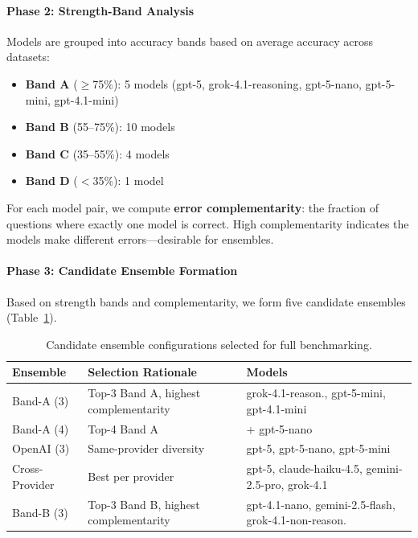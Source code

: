 \documentclass[11pt,a4paper]{article}
\begin{document}
\paragraph{Phase 2: Strength-Band Analysis}
Models are grouped into accuracy bands based on average accuracy across datasets:
\begin{itemize}
    \item \textbf{Band A} ($\geq$75\%): 5 models (gpt-5, grok-4.1-reasoning, gpt-5-nano, gpt-5-mini, gpt-4.1-mini)
    \item \textbf{Band B} (55--75\%): 10 models
    \item \textbf{Band C} (35--55\%): 4 models
    \item \textbf{Band D} ($<$35\%): 1 model
\end{itemize}

For each model pair, we compute \textbf{error complementarity}: the fraction of questions where exactly one model is correct.
High complementarity indicates the models make different errors---desirable for ensembles.

\paragraph{Phase 3: Candidate Ensemble Formation}
Based on strength bands and complementarity, we form five candidate ensembles (Table~\ref{tab:ensembles}).

\begin{table}[htbp]
\centering
\caption{Candidate ensemble configurations selected for full benchmarking.}
\label{tab:ensembles}
\small
\begin{tabular}{lll}
\toprule
\textbf{Ensemble} & \textbf{Selection Rationale} & \textbf{Models} \\
\midrule
Band-A (3) & Top-3 Band A, highest complementarity & grok-4.1-reason., gpt-5-mini, gpt-4.1-mini \\
Band-A (4) & Top-4 Band A & + gpt-5-nano \\
OpenAI (3) & Same-provider diversity & gpt-5, gpt-5-nano, gpt-5-mini \\
Cross-Provider & Best per provider & gpt-5, claude-haiku-4.5, gemini-2.5-pro, grok-4.1 \\
Band-B (3) & Top-3 Band B, highest complementarity & gpt-4.1-nano, gemini-2.5-flash, grok-4.1-non-reason. \\
\bottomrule
\end{tabular}
\end{table}
\end{document}
